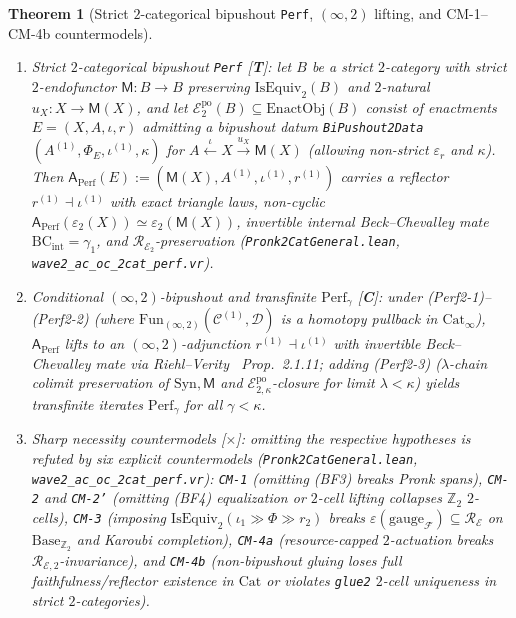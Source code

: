 \documentclass[11pt]{article}
\theoremstyle{plain}
\newtheorem{theorem}{Theorem}[section]
\theoremstyle{definition}
\newcommand{\cF}{\mathcal{F}}
\newcommand{\cC}{\mathcal{C}}
\newcommand{\Fun}{\mathrm{Fun}}
\newcommand{\Cat}{\mathrm{Cat}}
\newcommand{\Syn}{\mathrm{Syn}}
\newcommand{\cE}{\mathcal{E}}
\begin{document}
\begin{theorem}[Strict $2$-categorical bipushout \texttt{Perf}, $(\infty,2)$ lifting, and \textup{CM-1--CM-4b} countermodels]\label{thm:perf-2cat-obstructions}
\begin{enumerate}[nosep,label=(\roman*)]
\item \emph{Strict $2$-categorical bipushout \texttt{Perf} \textup{[\textbf{T}]}}: let $B$ be a strict $2$-category with strict $2$-endofunctor $\mathsf{M} : B \to B$ preserving $\mathrm{IsEquiv}_2(B)$ and $2$-natural $u_X : X \to \mathsf{M}(X)$, and let $\cE_2^{\mathrm{po}}(B) \subseteq \mathrm{EnactObj}(B)$ consist of enactments $E = (X, A, \iota, r)$ admitting a bipushout datum \texttt{BiPushout2Data} $(A^{(1)}, \Phi_E, \iota^{(1)}, \kappa)$ for $A \xleftarrow{\iota} X \xrightarrow{u_X} \mathsf{M}(X)$ (allowing non-strict $\varepsilon_r$ and $\kappa$). Then $\mathsf{A}_{\mathrm{Perf}}(E) := (\mathsf{M}(X), A^{(1)}, \iota^{(1)}, r^{(1)})$ carries a reflector $r^{(1)} \dashv \iota^{(1)}$ with exact triangle laws, non-cyclic $\mathsf{A}_{\mathrm{Perf}}(\varepsilon_2(X)) \simeq \varepsilon_2(\mathsf{M}(X))$, invertible internal Beck--Chevalley mate $\mathrm{BC}_{\mathrm{int}} = \gamma_1$, and $\mathcal{R}_{\cE_2}$-preservation (\texttt{Pronk2CatGeneral.lean}, \texttt{wave2\_ac\_oc\_2cat\_perf.vr}).
\item \emph{Conditional $(\infty, 2)$-bipushout and transfinite $\mathrm{Perf}_\gamma$ \textup{[\textbf{C}]}}: under \textup{(Perf2-1)--(Perf2-2)} (where $\Fun_{(\infty,2)}(\cC^{(1)}, \mathcal{D})$ is a homotopy pullback in $\Cat_\infty$), $\mathsf{A}_{\mathrm{Perf}}$ lifts to an $(\infty, 2)$-adjunction $r^{(1)} \dashv \iota^{(1)}$ with invertible Beck--Chevalley mate via Riehl--Verity~\cite{RiehlVerity2022} Prop.~2.1.11; adding \textup{(Perf2-3)} ($\lambda$-chain colimit preservation of $\Syn, \mathsf{M}$ and $\cE_{2,\kappa}^{\mathrm{po}}$-closure for limit $\lambda < \kappa$) yields transfinite iterates $\mathrm{Perf}_\gamma$ for all $\gamma < \kappa$.
\item \emph{Sharp necessity countermodels \textup{[\textbf{$\times$}]}}: omitting the respective hypotheses is refuted by six explicit countermodels (\texttt{Pronk2CatGeneral.lean}, \texttt{wave2\_ac\_oc\_2cat\_perf.vr}): \texttt{CM-1} (omitting \textup{(BF3)} breaks Pronk spans), \texttt{CM-2} and \texttt{CM-2'} (omitting \textup{(BF4)} equalization or $2$-cell lifting collapses $\mathbb{Z}_2$ $2$-cells), \texttt{CM-3} (imposing $\mathrm{IsEquiv}_2(\iota_1 \gg \Phi \gg r_2)$ breaks $\varepsilon(\mathrm{gauge}_\cF) \subseteq \mathcal{R}_\cE$ on $\mathrm{Base}_{\mathbb{Z}_2}$ and Karoubi completion), \texttt{CM-4a} (resource-capped $2$-actuation breaks $\mathcal{R}_{\cE,2}$-invariance), and \texttt{CM-4b} (non-bipushout gluing loses full faithfulness/reflector existence in $\Cat$ or violates \texttt{glue2} $2$-cell uniqueness in strict $2$-categories).
\end{enumerate}
\end{theorem}
\end{document}

